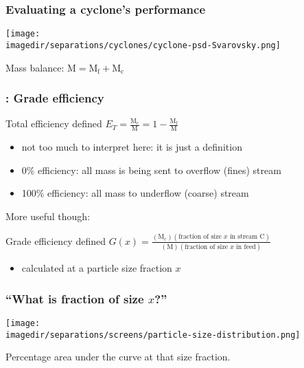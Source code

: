 \begin{frame}\frametitle{Evaluating a cyclone's performance}
	\begin{center}
		\texttt{[image: \\imagedir/separations/cyclones/cyclone-psd-Svarovsky.png]}
	\end{center}
	
	\vspace{-48pt}
	Mass balance: $\text{M} = \text{M}_\text{f} + \text{M}_\text{c}$	
	\vfill
\end{frame}

\begin{frame}\frametitle{{\color{myOrange}{Concept}}: Grade efficiency}
	\begin{exampleblock}{Total efficiency defined}
		$E_T = \displaystyle \frac{\text{M}_\text{c}}{\text{M}} = 1 - \displaystyle \frac{\text{M}_\text{f}}{\text{M}}$
	\end{exampleblock}	
	\begin{itemize}
		\item	not too much to interpret here: it is just a definition
		\item	0\% efficiency: all mass is being sent to overflow (fines) stream
		\item	100\% efficiency: all mass to underflow (coarse) stream
	\end{itemize}
	\vspace{12pt}
	More useful though:
	\begin{exampleblock}{Grade efficiency defined}
		$G(x) = \displaystyle \frac{(\text{M}_\text{c})(\text{fraction of size $x$ in stream C})}{(\text{M})(\text{fraction of size $x$ in feed})}$
	\end{exampleblock}
	\begin{itemize}
		\item	calculated at a particle size fraction $x$
	\end{itemize}	
\end{frame}

\begin{frame}\frametitle{``What is fraction of size $x$?''}	
	\begin{center}
		\texttt{[image: \\imagedir/separations/screens/particle-size-distribution.png]}
	\end{center}
	Percentage area under the curve at that size fraction.
\end{frame}

